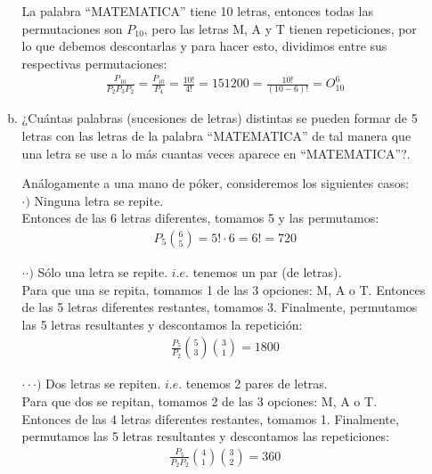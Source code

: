 \documentclass[letterpaper,11pt]{article}
\begin{document}
\begin{enumerate}
\begin{enumerate}[(a)]
        La palabra “MATEMATICA” tiene 10 letras, entonces todas las permutaciones
        son $P_{10}$, pero las letras M, A y T tienen repeticiones, por lo que debemos descontarlas y para hacer esto, dividimos entre sus respectivas permutaciones: \\
        \begin{align*}
          \frac{P_{10}}{P_2 P_3 P_2} = \frac{P_{10}}{P_4} = \frac{10!}{4!} = 151200 = \frac{10!}{(10 - 6) !} = O^6_{10}
        \end{align*}

        \item  ¿Cuántas palabras (sucesiones de letras) distintas se pueden formar de 5 letras con las letras de la palabra “MATEMATICA” de tal manera que una letra se use a lo más cuantas veces aparece en “MATEMATICA”?. \newline

        Análogamente a una mano de póker, consideremos los siguientes casos: \\

        $\cdot )$ Ninguna letra se repite. \\
        Entonces de las 6 letras diferentes, tomamos 5 y las permutamos:
        \begin{align*}
          P_5 \binom{6}{5} = 5! \cdot 6 = 6! = 720
        \end{align*}

        $\cdotp \cdot )$ Sólo una letra se repite. $i.e.$ tenemos un par (de letras).\\
        Para que una se repita, tomamos 1 de las 3 opciones: M, A o T.
        Entonces de las 5 letras diferentes restantes, tomamos 3.
        Finalmente, permutamos las 5 letras resultantes y descontamos la repetición:
        \begin{align*}
          \frac{P_5}{P_2} \binom{5}{3} \binom{3}{1} = 1800
        \end{align*}

        $\cdot \cdot \cdot )$ Dos letras se repiten. $i.e.$ tenemos 2 pares de letras.\\
        Para que dos se repitan, tomamos 2 de las 3 opciones: M, A o T.
        Entonces de las 4 letras diferentes restantes, tomamos 1.
        Finalmente, permutamos las 5 letras resultantes y descontamos las repeticiones:
        \begin{align*}
          \frac{P_5}{P_2 P_2} \binom{4}{1} \binom{3}{2} = 360
        \end{align*}


\end{enumerate}
\end{enumerate}
\end{document}
